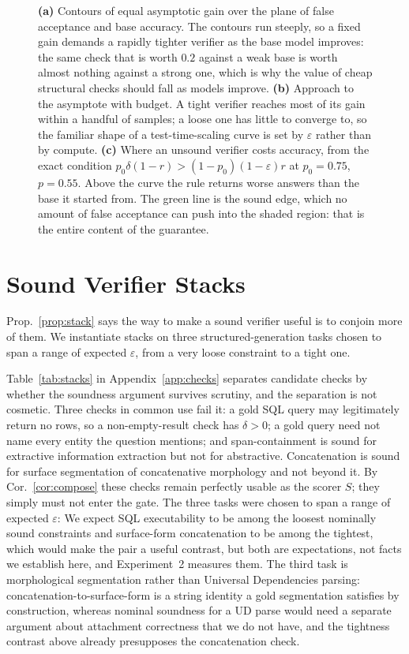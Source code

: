 \documentclass[11pt]{article}
\begin{document}
\begin{figure}[t]
{\textbf{(a)} Contours of equal asymptotic gain over the plane of false acceptance and base accuracy. The contours run steeply, so a fixed gain demands a rapidly tighter verifier as the base model improves: the same check that is worth $0.2$ against a weak base is worth almost nothing against a strong one, which is why the value of cheap structural checks should fall as models improve.
\textbf{(b)} Approach to the asymptote with budget. A tight verifier reaches most of its gain within a handful of samples; a loose one has little to converge to, so the familiar shape of a test-time-scaling curve is set by $\varepsilon$ rather than by compute.
\textbf{(c)} Where an unsound verifier costs accuracy, from the exact condition $p_0\delta(1-r)>(1-p_0)(1-\varepsilon)r$ at $p_0=0.75$, $p=0.55$. Above the curve the rule returns worse answers than the base it started from. The green line is the sound edge, which no amount of false acceptance can push into the shaded region: that is the entire content of the guarantee.}
\label{fig:regime}
\end{figure}

\section{Sound Verifier Stacks}\label{sec:stacks}
Prop.~\ref{prop:stack} says the way to make a sound verifier useful is to conjoin more of them. We instantiate stacks on three structured-generation tasks chosen to span a range of expected $\varepsilon$, from a very loose constraint to a tight one.



Table~\ref{tab:stacks} in Appendix~\ref{app:checks} separates candidate checks by whether the soundness argument survives scrutiny, and the separation is not cosmetic. Three checks in common use fail it: a gold SQL query may legitimately return no rows, so a non-empty-result check has $\delta>0$; a gold query need not name every entity the question mentions; and span-containment is sound for extractive information extraction but not for abstractive. Concatenation is sound for surface segmentation of concatenative morphology and not beyond it. By Cor.~\ref{cor:compose} these checks remain perfectly usable as the scorer $S$; they simply must not enter the gate. The three tasks were chosen to span a range of expected $\varepsilon$: We expect SQL executability to be among the loosest nominally sound constraints and surface-form concatenation to be among the tightest, which would make the pair a useful contrast, but both are expectations, not facts we establish here, and Experiment~2 measures them. The third task is morphological segmentation rather than Universal Dependencies parsing: concatenation-to-surface-form is a string identity a gold segmentation satisfies by construction, whereas nominal soundness for a UD parse would need a separate argument about attachment correctness that we do not have, and the tightness contrast above already presupposes the concatenation check.
\end{document}
